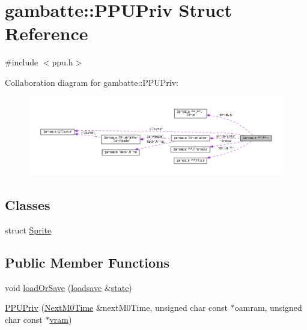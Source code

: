 \hypertarget{structgambatte_1_1PPUPriv}{}\section{gambatte\+:\+:P\+P\+U\+Priv Struct Reference}
\label{structgambatte_1_1PPUPriv}


{\ttfamily \#include $<$ppu.\+h$>$}



Collaboration diagram for gambatte\+:\+:P\+P\+U\+Priv\+:
\nopagebreak
\begin{figure}[H]
\begin{center}
\leavevmode
\includegraphics[width=350pt]{structgambatte_1_1PPUPriv__coll__graph}
\end{center}
\end{figure}
\subsection*{Classes}
\begin{DoxyCompactItemize}
\item 
struct \hyperlink{structgambatte_1_1PPUPriv_1_1Sprite}{Sprite}
\end{DoxyCompactItemize}
\subsection*{Public Member Functions}
\begin{DoxyCompactItemize}
\item 
void \hyperlink{structgambatte_1_1PPUPriv_a2d8e18da564e1da4b91c7fac4a11c4a3}{load\+Or\+Save} (\hyperlink{classgambatte_1_1loadsave}{loadsave} \&\hyperlink{ppu_8cpp_a2f2eca6997ee7baf8901725ae074d45b}{state})
\item 
\hyperlink{structgambatte_1_1PPUPriv_a8d7ac334a03adf6ac17861c62f9d1143}{P\+P\+U\+Priv} (\hyperlink{classgambatte_1_1NextM0Time}{Next\+M0\+Time} \&next\+M0\+Time, unsigned char const $\ast$oamram, unsigned char const $\ast$\hyperlink{structgambatte_1_1PPUPriv_a4ab22f440df8bcc60984c9058492dcde}{vram})
\end{DoxyCompactItemize}
